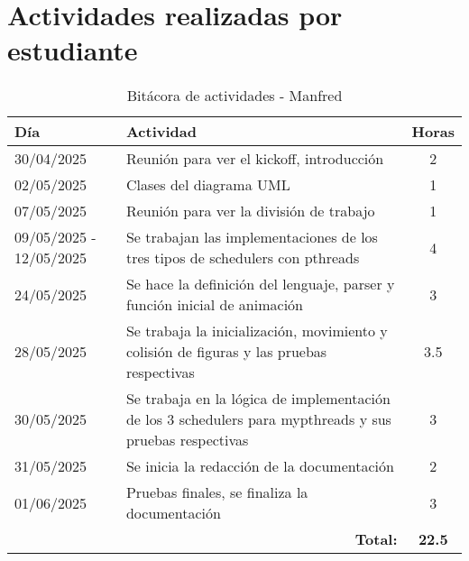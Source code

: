 \documentclass[12pt]{article}
\begin{document}
\section{Actividades realizadas por estudiante}
\begin{table}[H]
\centering
\caption{Bitácora de actividades - Manfred}
\begin{tabular}{|l|p{9cm}|c|}
\hline
\textbf{Día} & \textbf{Actividad} & \textbf{Horas} \\
\hline
30/04/2025 & Reunión para ver el kickoff, introducción & 2 \\
02/05/2025 & Clases del diagrama UML & 1 \\
07/05/2025 & Reunión para ver la división de trabajo & 1 \\
09/05/2025 - 12/05/2025 & Se trabajan las implementaciones de los tres tipos de schedulers con pthreads & 4 \\
24/05/2025 & Se hace la definición del lenguaje, parser y función inicial de animación & 3 \\
28/05/2025 & Se trabaja la inicialización, movimiento y colisión de figuras y las pruebas respectivas & 3.5 \\
30/05/2025 & Se trabaja en la lógica de implementación de los 3 schedulers para mypthreads y sus pruebas respectivas & 3 \\
31/05/2025 & Se inicia la redacción de la documentación & 2 \\
01/06/2025 & Pruebas finales, se finaliza la documentación & 3 \\
\hline
\multicolumn{2}{|r|}{\textbf{Total:}} & \textbf{22.5} \\
\hline
\end{tabular}
\end{table}
\end{document}
